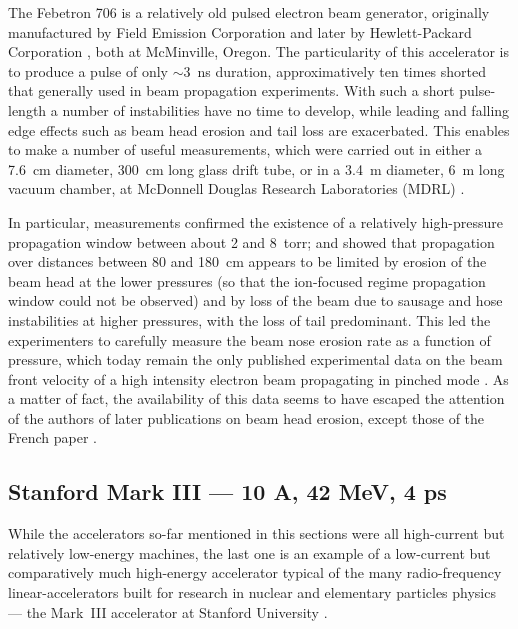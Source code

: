 \documentclass [12pt,a4paper,     ]{report} %
\begin{document}
The Febetron 706 is a relatively old pulsed electron beam generator, originally manufactured by Field Emission Corporation \cite{CHARB1967-} and later by Hewlett-Packard Corporation  \cite[Ref.11]{GREEN1985-}, both at McMinville, Oregon. The particularity of this accelerator is to produce a pulse of only $\sim$3~ns duration, approximatively ten times shorted that generally used in beam propagation experiments.  With such a short pulse-length a number of instabilities have no time to develop, while leading and falling edge effects such as beam head erosion and tail loss are exacerbated.  This enables to make a number of useful measurements, which were carried out in either a 7.6~cm diameter, 300~cm long glass drift tube, or in a 3.4~m diameter, 6~m long vacuum chamber, at McDonnell Douglas Research Laboratories (MDRL) \cite{GREEN1985-}.

   In particular, measurements confirmed the existence of a relatively high-pressure propagation window between about 2 and 8~torr; and showed that propagation over distances between 80 and 180~cm appears to be limited by erosion of the beam head at the lower pressures (so that the ion-focused regime propagation window could not be observed) and by loss of the beam due to sausage and hose instabilities at higher pressures, with the loss of tail predominant.  This led the experimenters to carefully measure the beam nose erosion rate as a function of pressure, which today remain the only published experimental data on the beam front velocity of a high intensity electron beam propagating in pinched mode \cite[Table~I\,]{GREEN1985-}.  As a matter of fact, the availability of this data seems to have escaped the attention of the authors of later publications on beam head erosion, except those of the French paper \cite{BOUCH1988-}. 


\subsection{Stanford Mark III --- 10 A, 42 MeV, 4 ps}

While the accelerators so-far mentioned in this sections were all high-current but relatively low-energy machines, the last one is an example of a low-current but comparatively much high-energy accelerator typical of the many radio-frequency linear-accelerators built for research in nuclear and elementary particles physics --- the Mark~III accelerator at Stanford University \cite{FISHE1988-}.
\end{document}
